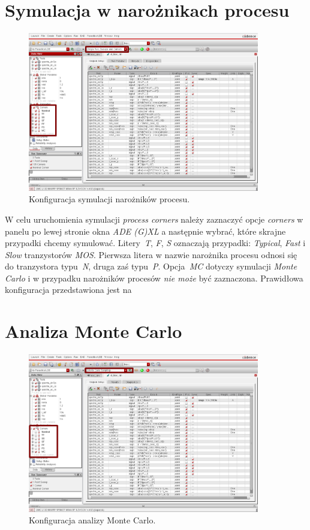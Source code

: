\documentclass[twoside,pl,final]{labman}
\begin{document}
\section{Symulacja w narożnikach procesu}
\label{work:corners}

\begin{figure}[!htbp]
  \centering
  \includegraphics[width=0.9\textwidth]{corners}
  \caption{Konfiguracja symulacji narożników procesu.}
  \label{fig:work:corners}
\end{figure}

W celu uruchomienia symulacji \emph{process corners} należy zaznaczyć
opcje \emph{corners} w panelu po lewej stronie okna \emph{ADE (G)XL}
a następnie wybrać, które skrajne przypadki chcemy symulować.
Litery~\emph{T}, \emph{F}, \emph{S} oznaczają przypadki:
\emph{Typical}, \emph{Fast} i \emph{Slow} tranzystorów \emph{MOS}.
Pierwsza litera w nazwie narożnika procesu odnosi się do
tranzystora typu~\emph{N}, druga zaś typu~\emph{P}.
Opcja~\emph{MC} dotyczy symulacji \emph{Monte Carlo} i w przypadku narożników
procesów \emph{nie może} być zaznaczona.
Prawidłowa konfiguracja przedstawiona jest na~

\section{Analiza Monte Carlo}
\label{work:montecarlo}

\begin{figure}[!htbp]
  \centering
  \includegraphics[width=0.9\textwidth]{mc}
  \caption{Konfiguracja analizy Monte Carlo.}
  \label{fig:work:mc}
\end{figure}
\end{document}
